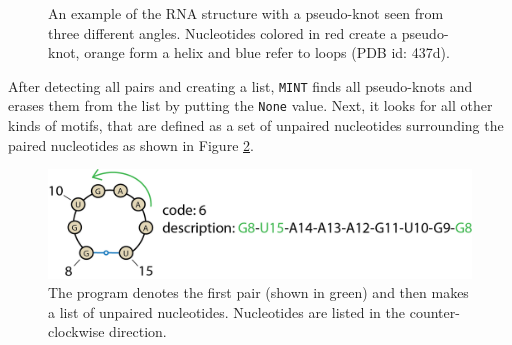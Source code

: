 \documentclass[12pt]{article}
\begin{document}
\begin{figure}[h!]
\begin{center}
\end{center}
\caption{An example of the RNA structure with a pseudo-knot seen from three different angles. Nucleotides colored in red create a pseudo-knot, orange form a helix and blue refer to loops (PDB id: 437d).}
\label{PseudoKnot}
\end{figure}
\newpage

After detecting all pairs and creating a list, {\tt MINT} finds all pseudo-knots and erases them from the list by putting the \texttt{None} value. Next, it looks for all other kinds of motifs, that are defined as a set of unpaired nucleotides surrounding the paired nucleotides as shown in Figure \ref{MotifDesc}.

\begin{figure}[h!]
\centering
\includegraphics[width = \textwidth]{./pictures/motifs_description.png}
\caption{The program denotes the first pair (shown in green) and then makes a list of unpaired nucleotides. Nucleotides are listed in the counter-clockwise direction.}
\label{MotifDesc}
\end{figure}
\end{document}
